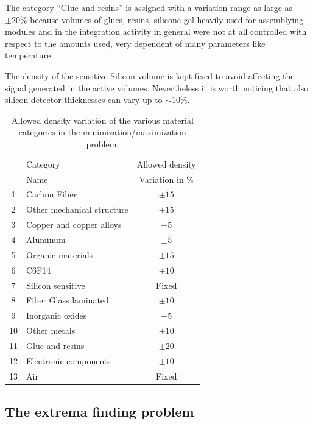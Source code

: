 \documentclass{cmspaper}
\begin{document}
\begin{itemize}
The category ``Glue and resins'' is assigned with a variation range as large as $\pm 20\%$ because volumes of glues, resins, silicone gel heavily used for assemblying modules and in the integration activity in general were not at all controlled with respect to the amounts used, very dependent of many parameters like temperature.

The density of the sensitive Silicon volume is kept fixed to avoid affecting the signal generated in the active volumes. Nevertheless it is worth noticing that also silicon detector thicknesses can vary up to $\sim 10\%$.
\end{itemize} 


\begin{table}[h]
\begin{center}
\begin{tabular}{clc}
  & Category    & Allowed density \\ 
  & Name        & Variation in $\%$    \\
  \hline 
  1 & Carbon Fiber               & $\pm15$ \\
  2 & Other mechanical structure & $\pm15$ \\
  3 & Copper and copper alloys   & $\pm5$ \\
  4 & Aluminum                   & $\pm5$\\ 
  5 & Organic materials          & $\pm15$ \\
  6 & C6F14                      & $\pm10$\\
  7 & Silicon sensitive          & Fixed                       \\
  8 & Fiber Glass laminated      & $\pm10$\\
  9 & Inorganic oxides           & $\pm5$ \\
 10 & Other metals               & $\pm10$\\
 11 & Glue and resins            & $\pm20$\\
 12 & Electronic components      & $\pm10$\\
 13 & Air                        & Fixed \\
\end{tabular}
\caption{Allowed density variation of the various material categories in the minimization/maximization problem.}
\label{table:catVariations}
\end{center}
\end{table}

\subsection{The extrema finding problem}
\end{document}
